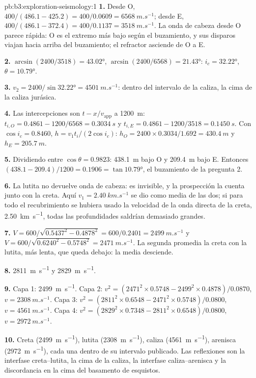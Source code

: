 \begin{solution}{pb:b3:exploration-seismology:1}
\textbf{1.} Desde O, $400/(486.1 - 425.2) = 400/0.0609 = \qty{6568}{m.s^{-1}}$;
desde E, $400/(486.1 - 372.4) = 400/0.1137 = \qty{3518}{m.s^{-1}}$. La onda de cabeza
desde O parece rápida: O es el extremo más bajo según el buzamiento, y sus disparos viajan hacia arriba del buzamiento; el
refractor asciende de O a E.

\textbf{2.} $\arcsin(2400/3518) = \ang{43.02}$, $\arcsin(2400/6568) =
\ang{21.43}$: $i_c = \ang{32.22}$, $\theta = \ang{10.79}$.

\textbf{3.} $v_2 = 2400/\sin\ang{32.22} = \qty{4501}{m.s^{-1}}$: dentro del
intervalo de la caliza, la cima de la caliza jurásica.

\textbf{4.} Las intercepciones son $t - x/v_{\text{app}}$ a \qty{1200}{m}:
$t_{i,O} = 0.4861 - 1200/6568 = \qty{0.3034}{s}$ y $t_{i,E} = 0.4861 -
1200/3518 = \qty{0.1450}{s}$. Con $\cos i_c = 0.8460$, $h = v_1t_i/(2\cos
i_c)$: $h_O = 2400\times0.3034/1.692 = \qty{430.4}{m}$ y $h_E =
\qty{205.7}{m}$.

\textbf{5.} Dividiendo entre $\cos\theta = 0.9823$: \qty{438.1}{m} bajo O y
\qty{209.4}{m} bajo E. Entonces $(438.1 - 209.4)/1200 = 0.1906 =
\tan\ang{10.79}$, el buzamiento de la pregunta 2.

\textbf{6.} La lutita no devuelve onda de cabeza: es invisible, y la prospección
la cuenta junto con la creta. Aquí $v_1 = \qty{2.40}{km.s^{-1}}$ se dio como
media de las dos; si para todo el recubrimiento se hubiera usado la velocidad de la
onda directa de la creta, \qty{2.50}{km.s^{-1}}, todas las profundidades saldrían demasiado grandes.

\textbf{7.} $V = 600/\sqrt{0.5437^2 - 0.4878^2} = 600/0.2401 =
\qty{2499}{m.s^{-1}}$ y $V = 600/\sqrt{0.6240^2 - 0.5748^2} =
\qty{2471}{m.s^{-1}}$. La segunda promedia la creta con la lutita, más lenta,
que queda debajo: la media desciende.

\textbf{8.} \qty{2811}{m.s^{-1}} y \qty{2829}{m.s^{-1}}.

\textbf{9.} Capa 1: \qty{2499}{m.s^{-1}}. Capa 2: $v^2 = (2471^2\times0.5748
- 2499^2\times0.4878)/0.0870$, $v = \qty{2308}{m.s^{-1}}$. Capa 3:
$v^2 = (2811^2\times0.6548 - 2471^2\times0.5748)/0.0800$,
$v = \qty{4561}{m.s^{-1}}$. Capa 4: $v^2 = (2829^2\times0.7348 -
2811^2\times0.6548)/0.0800$, $v = \qty{2972}{m.s^{-1}}$.

\textbf{10.} Creta (\qty{2499}{m.s^{-1}}), lutita (\qty{2308}{m.s^{-1}}),
caliza (\qty{4561}{m.s^{-1}}), arenisca (\qty{2972}{m.s^{-1}}), cada una dentro
de su intervalo publicado. Las reflexiones son la interfase creta--lutita, la
cima de la caliza, la interfase caliza--arenisca y la discordancia en
la cima del basamento de esquistos.


\end{solution}
